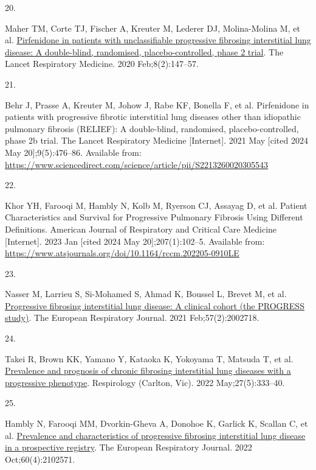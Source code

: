\documentclass[
]{article}
\newlength{\cslhangindent}
\newlength{\csllabelwidth}
\newenvironment{CSLReferences}[2] %
 {\begin{list}{}{%
  \setlength{\itemindent}{0pt}
  \setlength{\leftmargin}{0pt}
  \setlength{\parsep}{0pt}
  \ifodd #1
   \setlength{\leftmargin}{\cslhangindent}
   \setlength{\itemindent}{-1\cslhangindent}
  \fi
  \setlength{\itemsep}{#2\baselineskip}}}
 {\end{list}}
\newcommand{\CSLLeftMargin}[1]{\parbox[t]{\csllabelwidth}{\strut#1\strut}}
\newcommand{\CSLRightInline}[1]{\parbox[t]{\linewidth - \csllabelwidth}{\strut#1\strut}}
\begin{document}
\begin{CSLReferences}{0}{1}
\CSLLeftMargin{20. }%
\CSLRightInline{Maher TM, Corte TJ, Fischer A, Kreuter M, Lederer DJ, Molina-Molina M, et al. \href{https://doi.org/10.1016/S2213-2600(19)30341-8}{Pirfenidone in patients with unclassifiable progressive fibrosing interstitial lung disease: A double-blind, randomised, placebo-controlled, phase 2 trial}. The Lancet Respiratory Medicine. 2020 Feb;8(2):147--57. }

\CSLLeftMargin{21. }%
\CSLRightInline{Behr J, Prasse A, Kreuter M, Johow J, Rabe KF, Bonella F, et al. Pirfenidone in patients with progressive fibrotic interstitial lung diseases other than idiopathic pulmonary fibrosis ({RELIEF}): A double-blind, randomised, placebo-controlled, phase 2b trial. The Lancet Respiratory Medicine {[}Internet{]}. 2021 May {[}cited 2024 May 20{]};9(5):476--86. Available from: \url{https://www.sciencedirect.com/science/article/pii/S2213260020305543}}

\CSLLeftMargin{22. }%
\CSLRightInline{Khor YH, Farooqi M, Hambly N, Kolb M, Ryerson CJ, Assayag D, et al. Patient {Characteristics} and {Survival} for {Progressive} {Pulmonary} {Fibrosis} {Using} {Different} {Definitions}. American Journal of Respiratory and Critical Care Medicine {[}Internet{]}. 2023 Jan {[}cited 2024 May 20{]};207(1):102--5. Available from: \url{https://www.atsjournals.org/doi/10.1164/rccm.202205-0910LE}}

\CSLLeftMargin{23. }%
\CSLRightInline{Nasser M, Larrieu S, Si-Mohamed S, Ahmad K, Boussel L, Brevet M, et al. \href{https://doi.org/10.1183/13993003.02718-2020}{Progressive fibrosing interstitial lung disease: A clinical cohort (the {PROGRESS} study)}. The European Respiratory Journal. 2021 Feb;57(2):2002718. }

\CSLLeftMargin{24. }%
\CSLRightInline{Takei R, Brown KK, Yamano Y, Kataoka K, Yokoyama T, Matsuda T, et al. \href{https://doi.org/10.1111/resp.14245}{Prevalence and prognosis of chronic fibrosing interstitial lung diseases with a progressive phenotype}. Respirology (Carlton, Vic). 2022 May;27(5):333--40. }

\CSLLeftMargin{25. }%
\CSLRightInline{Hambly N, Farooqi MM, Dvorkin-Gheva A, Donohoe K, Garlick K, Scallan C, et al. \href{https://doi.org/10.1183/13993003.02571-2021}{Prevalence and characteristics of progressive fibrosing interstitial lung disease in a prospective registry}. The European Respiratory Journal. 2022 Oct;60(4):2102571. }


\end{CSLReferences}
\end{document}
